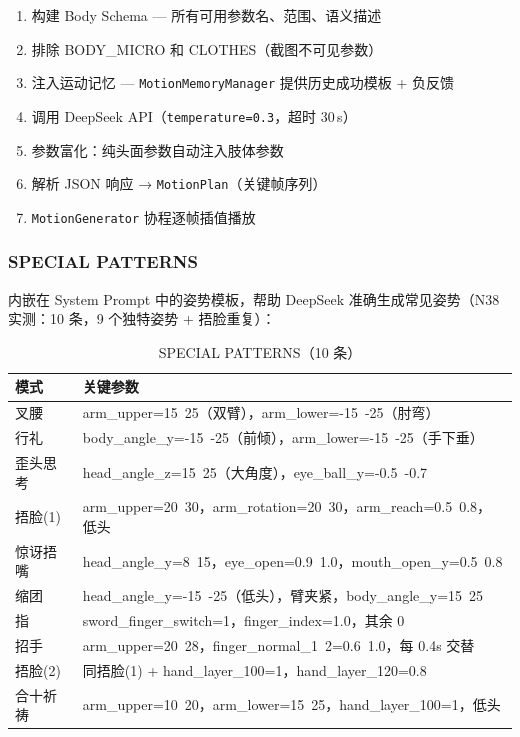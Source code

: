 \documentclass[12pt,a4paper]{ctexart}
\begin{document}
\begin{enumerate}
    \item 构建 Body Schema --- 所有可用参数名、范围、语义描述
    \item 排除 BODY\_MICRO 和 CLOTHES（截图不可见参数）
    \item 注入运动记忆 --- \texttt{MotionMemoryManager} 提供历史成功模板 + 负反馈
    \item 调用 DeepSeek API（\texttt{temperature=0.3}，超时 30\,s）
    \item 参数富化：纯头面参数自动注入肢体参数
    \item 解析 JSON 响应 → \texttt{MotionPlan}（关键帧序列）
    \item \texttt{MotionGenerator} 协程逐帧插值播放
\end{enumerate}

\subsubsection{SPECIAL PATTERNS}

内嵌在 System Prompt 中的姿势模板，帮助 DeepSeek 准确生成常见姿势（N38 实测：10 条，9 个独特姿势 + 捂脸重复）：

\begin{table}[H]
\centering
\caption{SPECIAL PATTERNS（10 条）}
\label{tab:special-patterns}
\begin{tabular}{ll}
\toprule
\textbf{模式} & \textbf{关键参数} \\
\midrule
叉腰 & arm\_upper=15~25（双臂），arm\_lower=-15~-25（肘弯） \\
行礼 & body\_angle\_y=-15~-25（前倾），arm\_lower=-15~-25（手下垂） \\
歪头思考 & head\_angle\_z=15~25（大角度），eye\_ball\_y=-0.5~-0.7 \\
捂脸(1) & arm\_upper=20~30，arm\_rotation=20~30，arm\_reach=0.5~0.8，低头 \\
惊讶捂嘴 & head\_angle\_y=8~15，eye\_open=0.9~1.0，mouth\_open\_y=0.5~0.8 \\
缩团 & head\_angle\_y=-15~-25（低头），臂夹紧，body\_angle\_y=15~25 \\
指 & sword\_finger\_switch=1，finger\_index=1.0，其余 0 \\
招手 & arm\_upper=20~28，finger\_normal\_1~2=0.6~1.0，每 0.4s 交替 \\
捂脸(2) & 同捂脸(1) + hand\_layer\_100=1，hand\_layer\_120=0.8 \\
合十祈祷 & arm\_upper=10~20，arm\_lower=15~25，hand\_layer\_100=1，低头 \\
\bottomrule
\end{tabular}
\end{table}
\end{document}
